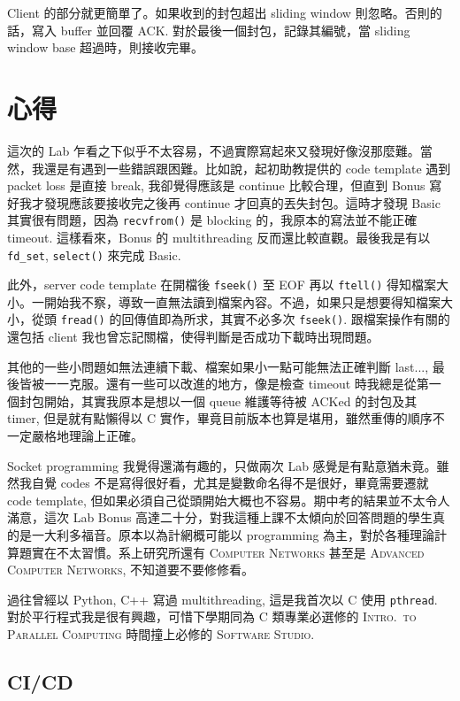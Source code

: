 \documentclass[12pt, a4paper]{article}
\begin{document}
Client 的部分就更簡單了。如果收到的封包超出 sliding window 則忽略。否則的話，寫入 buffer 並回覆 ACK. 對於最後一個封包，記錄其編號，當 sliding window base 超過時，則接收完畢。

\section{心得}

這次的 Lab 乍看之下似乎不太容易，不過實際寫起來又發現好像沒那麼難。當然，我還是有遇到一些錯誤跟困難。比如說，起初助教提供的 code template 遇到 packet loss 是直接 break, 我卻覺得應該是 continue 比較合理，但直到 Bonus 寫好我才發現應該要接收完之後再 continue 才回真的丟失封包。這時才發現 Basic 其實很有問題，因為 \texttt{recvfrom()} 是 blocking 的，我原本的寫法並不能正確 timeout. 這樣看來，Bonus 的 multithreading 反而還比較直觀。最後我是有以 \texttt{fd\_set}, \texttt{select()} 來完成 Basic.

此外，server code template 在開檔後 \texttt{fseek()} 至 EOF 再以 \texttt{ftell()} 得知檔案大小。一開始我不察，導致一直無法讀到檔案內容。不過，如果只是想要得知檔案大小，從頭 \texttt{fread()} 的回傳值即為所求，其實不必多次 \texttt{fseek()}. 跟檔案操作有關的還包括 client 我也曾忘記關檔，使得判斷是否成功下載時出現問題。

其他的一些小問題如無法連續下載、檔案如果小一點可能無法正確判斷 last..., 最後皆被一一克服。還有一些可以改進的地方，像是檢查 timeout 時我總是從第一個封包開始，其實我原本是想以一個 queue 維護等待被 ACKed 的封包及其 timer, 但是就有點懶得以 C 實作，畢竟目前版本也算是堪用，雖然重傳的順序不一定嚴格地理論上正確。

Socket programming 我覺得還滿有趣的，只做兩次 Lab 感覺是有點意猶未竟。雖然我自覺 codes 不是寫得很好看，尤其是變數命名得不是很好，畢竟需要遷就 code template, 但如果必須自己從頭開始大概也不容易。期中考的結果並不太令人滿意，這次 Lab Bonus 高達二十分，對我這種上課不太傾向於回答問題的學生真的是一大利多福音。原本以為計網概可能以 programming 為主，對於各種理論計算題實在不太習慣。系上研究所還有 \textsc{Computer Networks} 甚至是 \textsc{Advanced Computer Networks}, 不知道要不要修修看。

過往曾經以 Python, C++ 寫過 multithreading, 這是我首次以 C 使用 \texttt{pthread}. 對於平行程式我是很有興趣，可惜下學期同為 C 類專業必選修的 \textsc{Intro.~to Parallel Computing} 時間撞上必修的 \textsc{Software Studio}.

\subsection{CI/CD}
\end{document}
